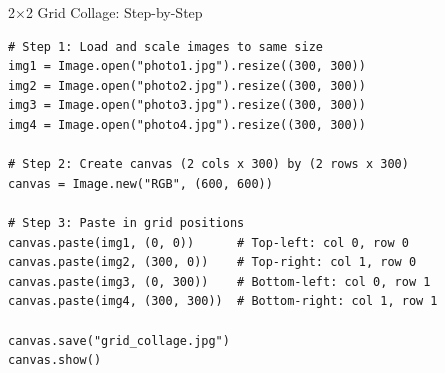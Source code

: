 \documentclass{csbeamer}
\begin{document}
\begin{frame}[fragile]{2×2 Grid Collage: Step-by-Step}
    \begin{lstlisting}
# Step 1: Load and scale images to same size
img1 = Image.open("photo1.jpg").resize((300, 300))
img2 = Image.open("photo2.jpg").resize((300, 300))
img3 = Image.open("photo3.jpg").resize((300, 300))
img4 = Image.open("photo4.jpg").resize((300, 300))

# Step 2: Create canvas (2 cols x 300) by (2 rows x 300)
canvas = Image.new("RGB", (600, 600))

# Step 3: Paste in grid positions
canvas.paste(img1, (0, 0))      # Top-left: col 0, row 0
canvas.paste(img2, (300, 0))    # Top-right: col 1, row 0
canvas.paste(img3, (0, 300))    # Bottom-left: col 0, row 1
canvas.paste(img4, (300, 300))  # Bottom-right: col 1, row 1

canvas.save("grid_collage.jpg")
canvas.show()
    \end{lstlisting}
\end{frame}
\end{document}
